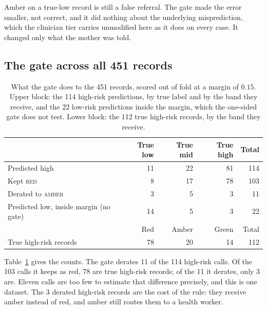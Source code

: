 Amber on a true-low record is still a false referral. The gate made the error
smaller, not correct, and it did nothing about the underlying misprediction,
which the clinician tier carries unmodified here as it does on every case.
It changed only what the mother was told.

\subsection{The gate across all 451 records}
\label{sec:tiers-gate}

\begin{table}[t]
\centering
\caption{What the gate does to the 451 records, scored out of fold at a margin
of $0.15$. Upper block: the 114 high-risk predictions, by true label and by
the band they receive, and the 22 low-risk predictions inside the margin,
which the one-sided gate does not test. Lower block: the 112 true high-risk
records, by the band they receive.}
\label{tab:gate}
\begin{tabular}{lrrrr}
\toprule
 & True low & True mid & True high & Total \\
\midrule
Predicted high   & 11 & 22 & 81 & 114 \\
Kept \textsc{red}      & 8  & 17 & 78 & 103 \\
Derated to \textsc{amber} & 3  & 5  & 3  & 11  \\
\addlinespace
Predicted low, inside margin (no gate) & 14 & 5 & 3 & 22 \\
\midrule
 & Red & Amber & Green & Total \\
\midrule
True high-risk records & 78 & 20 & 14 & 112 \\
\bottomrule
\end{tabular}
\end{table}

Table~\ref{tab:gate} gives the counts. The gate derates 11 of the 114
high-risk calls. Of the 103 calls it keeps as red, 78 are true high-risk
records; of the 11 it derates, only 3 are. Eleven calls are too few to
estimate that difference precisely, and this is one dataset. The 3 derated
high-risk records are the cost of the rule: they receive amber instead of red,
and amber still routes them to a health worker.

